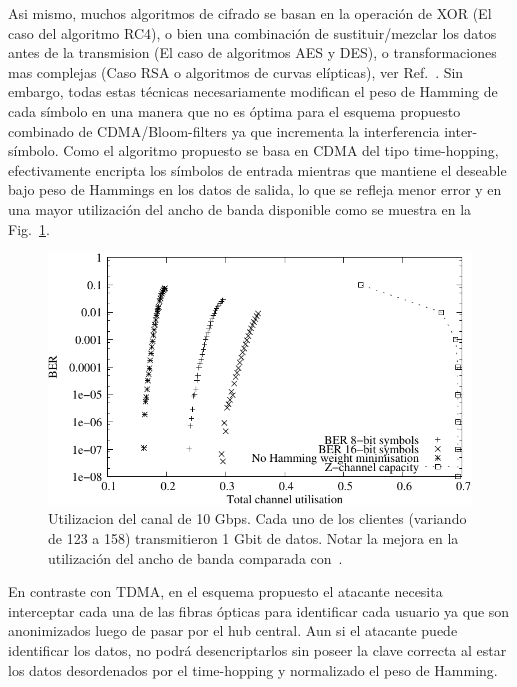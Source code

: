 Asi mismo, muchos algoritmos de cifrado se basan en la operación de XOR (El caso del algoritmo RC4), o bien una combinación de sustituir/mezclar los datos antes de la transmision (El caso de algoritmos AES y DES), o transformaciones mas complejas (Caso RSA o algoritmos de curvas elípticas), ver Ref.~\cite{Menezes:1996:HAC:548089}.
Sin embargo, todas estas técnicas necesariamente modifican el peso de Hamming de cada símbolo en una manera que no es óptima para el esquema propuesto combinado de CDMA/Bloom-filters ya que incrementa la interferencia inter-símbolo.
Como el algoritmo propuesto se basa en CDMA del tipo time-hopping, efectivamente encripta los símbolos de entrada mientras que mantiene el deseable bajo peso de Hammings en los datos de salida, lo que se refleja menor error y en una mayor utilización del ancho de banda disponible como se muestra en la Fig.~\ref{fig_use}.

\begin{figure}[t]
  \centering
  \includegraphics[width=0.48 \textwidth]{BERvsChannel} 
  \caption{Utilizacion del canal de 10 Gbps. Cada uno de los clientes (variando de 123 a 158) transmitieron 1 Gbit de datos. Notar la mejora en la utilización del ancho de banda comparada con~\cite{ortega11}.}
  \label{fig_use}
\end{figure}

En contraste con TDMA, en el esquema propuesto el atacante necesita interceptar cada una de las fibras ópticas para identificar cada usuario ya que son anonimizados luego de pasar por el hub central. Aun si el atacante puede identificar los datos, no podrá desencriptarlos sin poseer la clave correcta al estar los datos desordenados por el time-hopping y normalizado el peso de Hamming.
